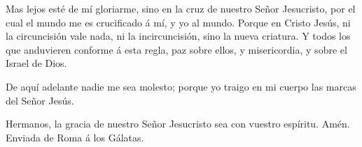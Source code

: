  Mas lejos esté de mí gloriarme, sino en la cruz de
nuestro Señor Jesucristo, por el cual el mundo me es crucificado á mí, y
yo al mundo.  Porque en Cristo Jesús, ni la circuncisión
vale nada, ni la incircuncisión, sino la nueva criatura. 
Y todos los que anduvieren conforme á esta regla, paz sobre ellos, y
misericordia, y sobre el Israel de Dios.

 De aquí adelante nadie me sea molesto; porque yo traigo
en mi cuerpo las marcas del Señor Jesús.

 Hermanos, la gracia de nuestro Señor Jesucristo sea con
vuestro espíritu. Amén. Enviada de Roma á los Gálatas.
